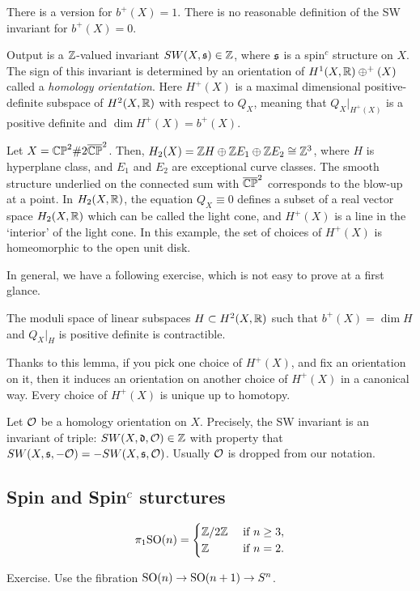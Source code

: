 \documentclass{../../../small}
\begin{document}
\begin{rmk}
There is a version for $b^+(X)=1$.
There is no reasonable definition of the SW invariant for $b^+(X)=0$.
\end{rmk}

Output is a $\mathbb{Z}$-valued invariant $SW(X,\mathfrak{s})\in\mathbb{Z}$, where $\mathfrak{s}$ is a spin$^c$ structure on $X$.
The sign of this invariant is determined by an orientation of $H^1(X,\mathbb{R})\oplus^+(X)$ called a \emph{homology orientation}.
Here $H^+(X)$ is a maximal dimensional positive-definite subspace of $H^2(X,\mathbb{R})$ with respect to $Q_X$, meaning that $Q_X|_{H^+(X)}$ is a positive definite and $\dim H^+(X)=b^+(X)$.


\begin{ex}
Let $X=\mathbb{CP}^2\#2\overline{\mathbb{CP}}^2$.
Then, $H_2(X)=\mathbb{Z} H\oplus\mathbb{Z} E_1\oplus\mathbb{Z} E_2\cong\mathbb{Z}^3$, where $H$ is hyperplane class, and $E_1$ and $E_2$ are exceptional curve classes.
The smooth structure underlied on the connected sum with $\overline{\mathbb{CP}}^2$ corresponds to the blow-up at a point.
In $H_2(X,\mathbb{R})$, the equation $Q_X\equiv0$ defines a subset of a real vector space $H_2(X,\mathbb{R})$ which can be called the light cone, and $H^+(X)$ is a line in the `interior' of the light cone.
In this example, the set of choices of $H^+(X)$ is homeomorphic to the open unit disk.
\end{ex}

In general, we have a following exercise, which is not easy to prove at a first glance.

\begin{lem}
The moduli space of linear subspaces $H\subset H^2(X,\mathbb{R})$ such that $b^+(X)=\dim H$ and $Q_X|_H$ is positive definite is contractible.
\end{lem}

Thanks to this lemma, if you pick one choice of $H^+(X)$, and fix an orientation on it, then it induces an orientation on another choice of $H^+(X)$ in a canonical way.
Every choice of $H^+(X)$ is unique up to homotopy.

Let $\mathcal{O}$ be a homology orientation on $X$.
Precisely, the SW invariant is an invariant of triple: $SW(X,\mathfrak{d},\mathcal{O})\in\mathbb{Z}$ with property that $SW(X,\mathfrak{s},-\mathcal{O})=-SW(X,\mathfrak{s},\mathcal{O})$.
Usually $\mathcal{O}$ is dropped from our notation.

\subsection{Spin and Spin$^c$ sturctures}


\begin{lem}
\[\pi_1\mathrm{SO}(n)=\begin{cases}
\mathbb{Z}/2\mathbb{Z}&\text{ if }n\ge3,\\
\mathbb{Z}&\text{ if }n=2.
\end{cases}\]
\end{lem}
\begin{pf}
Exercise.
Use the fibration $\mathrm{SO}(n)\to\mathrm{SO}(n+1)\to S^n$.
\end{pf}
\end{document}
